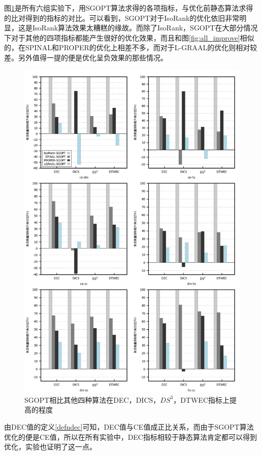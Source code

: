 图\ref{fig:other}是所有六组实验下，用SGOPT算法求得的各项指标，与优化前静态算法求得的比对得到的指标的对比。可以看到，SGOPT对于IsoRank的优化依旧非常明显，这是IsoRank算法效果太糟糕的缘故。而除了IsoRank，SGOPT在大部分情况下对于其他的四项指标都能产生很好的优化效果，而且和图\ref{fig:all_improve}相似的，在SPINAL和PROPER的优化上相差不多，而对于L-GRAAL的优化则相对较差。另外值得一提的便是优化呈负效果的那些情况。

\begin{figure}[htbp]
\centering
\includegraphics[width=\textwidth]{pic/other.png}
\caption{SGOPT相比其他四种算法在DEC，DICS，$DS^3$，DTWEC指标上提高的程度} 
\label{fig:other}
\end{figure}

由DEC值的定义\ref{defndec}可知，DEC值与CE值成正比关系，而由于SGOPT算法优化的便是CE值，所以在所有实验中，DEC指标相较于静态算法肯定都可以得到优化，实验也证明了这一点。

